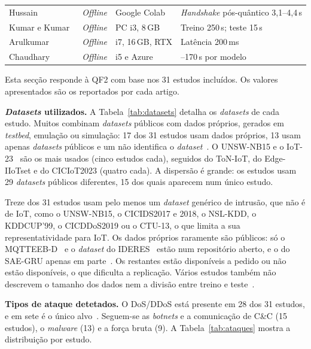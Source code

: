 \documentclass[conference,a4paper]{IEEEtran}
\begin{document}
\begin{table}[p]
\begin{tabular}{@{}>{\raggedright\arraybackslash}p{}>{\raggedright\arraybackslash}p{}>{\raggedright\arraybackslash}p{}>{\raggedright\arraybackslash}p{}@{}}
Hussain~\cite{hussain2026postquantum} & \textit{Offline} & Google Colab & \textit{Handshake} pós-quântico 3,1--4,4\,s \\
Kumar e Kumar~\cite{kumar2025advanced} & \textit{Offline} & PC i3, 8\,GB & Treino 250\,s; teste 15\,s \\
Arulkumar~\cite{Arulkumar2026} & \textit{Offline} & i7, 16\,GB, RTX & Latência 200\,ms \\
Chaudhary~\cite{Chaudhary2025} & \textit{Offline} & i5 e Azure & 115--170\,s por modelo \\
\bottomrule
\end{tabular}
\end{table}
Esta secção responde à QF2 com base nos 31 estudos incluídos. Os valores
apresentados são os reportados por cada artigo.

\textbf{\textit{Datasets} utilizados.} A Tabela~\ref{tab:datasets} detalha os
\textit{datasets} de cada estudo. Muitos combinam \textit{datasets} públicos com dados
próprios, gerados em \textit{testbed}, emulação ou simulação: 17 dos 31 estudos usam
dados próprios, 13 usam apenas \textit{datasets} públicos e um não identifica o
\textit{dataset}~\cite{karibandi2025cyberdome}. O UNSW-NB15 e o IoT-23~\cite{iot23} são
os mais usados (cinco estudos cada), seguidos do ToN-IoT, do Edge-IIoTset e do CICIoT2023
(quatro cada). A dispersão é grande: os estudos usam 29 \textit{datasets} públicos
diferentes, 15 dos quais aparecem num único estudo.

Treze dos 31 estudos usam pelo menos um \textit{dataset} genérico de intrusão, que não é
de IoT, como o UNSW-NB15, o CICIDS2017 e 2018, o NSL-KDD, o KDDCUP'99, o CICDDoS2019 ou o
CTU-13, o que limita a sua representatividade para IoT. Os dados próprios raramente são
públicos: só o MQTTEEB-D~\cite{karam2025isaaf} e o \textit{dataset} do
IDERES~\cite{rose2022ideres} estão num repositório aberto, e o do SAE-GRU apenas em
parte~\cite{tariq2025saegru}. Os restantes estão disponíveis a pedido ou não estão
disponíveis, o que dificulta a replicação. Vários estudos também não descrevem o tamanho
dos dados nem a divisão entre treino e
teste~\cite{kumar2025advanced,gowtham2026fedmp,tariq2025saegru,toony2024multiblock}.


\textbf{Tipos de ataque detetados.} O DoS/DDoS está presente em 28 dos 31 estudos, e em
sete é o único
alvo~\cite{gowtham2026fedmp,mazhar2022ridps,garba2024sdn,ramirezmartinez2025p4,andrade2024ddos,kponyo2020lightweight,Chaudhary2025}.
Seguem-se as \textit{botnets} e a comunicação de C\&C (15 estudos), o \textit{malware} (13)
e a força bruta (9). A Tabela~\ref{tab:ataques} mostra a distribuição por estudo.
\end{document}
